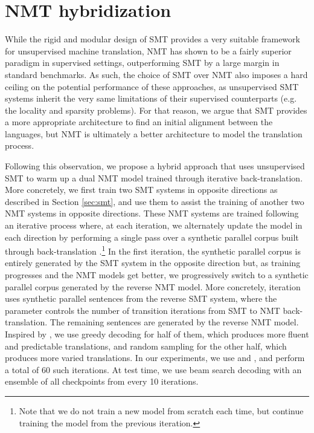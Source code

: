 \documentclass[11pt,a4paper]{article}
\begin{document}
\section{NMT hybridization}
\label{sec:nmt}

While the rigid and modular design of SMT provides a very suitable framework for unsupervised machine translation, NMT has shown to be a fairly superior paradigm in supervised settings, outperforming SMT by a large margin in standard benchmarks. As such, the choice of SMT over NMT also imposes a hard ceiling on the potential performance of these approaches, as unsupervised SMT systems inherit the very same limitations of their supervised counterparts (e.g. the locality and sparsity problems). For that reason, we argue that SMT provides a more appropriate architecture to find an initial alignment between the languages, but NMT is ultimately a better architecture to model the translation process.

Following this observation, we propose a hybrid approach that uses unsupervised SMT to warm up a dual NMT model trained through iterative back-translation. More concretely, we first train two SMT systems in opposite directions as described in Section \ref{sec:smt}, and use them to assist the training of another two NMT systems in opposite directions. These NMT systems are trained following an iterative process where, at each iteration, we alternately update the model in each direction by performing a single pass over a synthetic parallel corpus built through back-translation \citep{sennrich2016improving}.\footnote{Note that we do not train a new model from scratch each time, but continue training the model from the previous iteration.} In the first iteration, the synthetic parallel corpus is entirely generated by the SMT system in the opposite direction but, as training progresses and the NMT models get better, we progressively switch to a synthetic parallel corpus generated by the reverse NMT model. More concretely, iteration  uses  synthetic parallel sentences from the reverse SMT system, where the parameter  controls the number of transition iterations from SMT to NMT back-translation. The remaining  sentences are generated by the reverse NMT model. Inspired by \citet{edunov2018understanding}, we use greedy decoding for half of them, which produces more fluent and predictable translations, and random sampling for the other half, which produces more varied translations.
In our experiments, we use  and , and perform a total of 60 such iterations. At test time, we use beam search decoding with an ensemble of all checkpoints from every 10 iterations.
\end{document}
